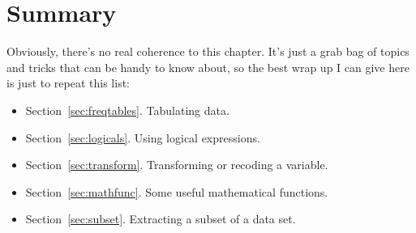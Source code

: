 \begin{comment}
\SUBSECTION{What other options are there?}

The advantage to the approach described in the previous section is that it solves a quite specific problem (but a commonly encountered one) with a minimum of fuss. The disadvantage is that the tools are quite limited in scope. They allow you to switch your data back and forth between two different formats that are very common in everyday data analysis. However, there a number of other tools that you can use if need be. Just within the core packages distributed with \R\ there is the \rtext{reshape()} function, as well as  the \rtext{stack()} and \rtext{unstack()} functions, all of which can be useful under certain circumstances. And there are of course thousands of packages on CRAN that you can use to help you with different tasks. One popular package for this purpose is the \rtext{reshape} package, written by Hadley Wickham \parencite[see][for details]{Wickham2007}. There are two key functions in this package, called \rtext{melt()} and \rtext{cast()} that are pretty useful for solving a lot of reshaping problems. In a future version of this book I intend to discuss \rtext{melt()} and \rtext{cast()} in a fair amount of detail.


\end{comment}


\section{Summary}

Obviously, there's no real coherence to this chapter. It's just a grab bag of topics and tricks that can be handy to know about, so the best wrap up I can give here is just to repeat this list:

\begin{itemize} 
\item Section~\ref{sec:freqtables}. Tabulating data.
\item Section~\ref{sec:logicals}. Using logical expressions.
\item Section~\ref{sec:transform}. Transforming or recoding a variable.
\item Section~\ref{sec:mathfunc}. Some useful mathematical functions.
\item Section~\ref{sec:subset}. Extracting a subset of a data set.
\end{itemize}



